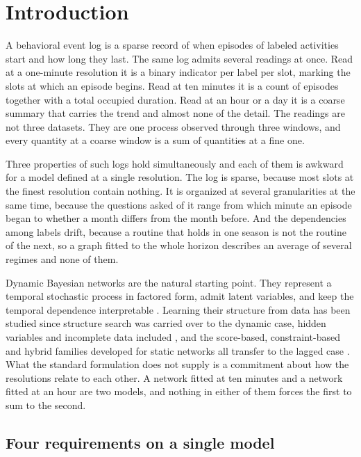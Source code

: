 \section{Introduction}
\label{sec:introduction}

A behavioral event log is a sparse record of when episodes of labeled activities
start and how long they last. The same log admits several readings at once. Read
at a one-minute resolution it is a binary indicator per label per slot, marking
the slots at which an episode begins. Read at ten minutes it is a count of
episodes together with a total occupied duration. Read at an hour or a day it is
a coarse summary that carries the trend and almost none of the detail. The
readings are not three datasets. They are one process observed through three
windows, and every quantity at a coarse window is a sum of quantities at a fine
one.

Three properties of such logs hold simultaneously and each of them is awkward for
a model defined at a single resolution. The log is sparse, because most slots at
the finest resolution contain nothing. It is organized at several granularities
at the same time, because the questions asked of it range from which minute an
episode began to whether a month differs from the month before. And the
dependencies among labels drift, because a routine that holds in one season is
not the routine of the next, so a graph fitted to the whole horizon describes an
average of several regimes and none of them.

Dynamic Bayesian networks are the natural starting point. They represent a
temporal stochastic process in factored form, admit latent variables, and keep
the temporal dependence interpretable \citep{dean1989model, murphy2002dbn}.
Learning their structure from data has been studied since structure search was
carried over to the dynamic case, hidden variables and incomplete data included
\citep{friedman1998learning}, and the score-based, constraint-based and hybrid
families developed for static networks all transfer to the lagged case
\citep{heckerman1995learning, spirtes2000causation, chickering2002optimal,
tsamardinos2006max}. What the standard formulation does not supply is a
commitment about how the resolutions relate to each other. A network fitted at
ten minutes and a network fitted at an hour are two models, and nothing in either
of them forces the first to sum to the second.

\subsection{Four requirements on a single model}
\label{sec:intro_requirements}

